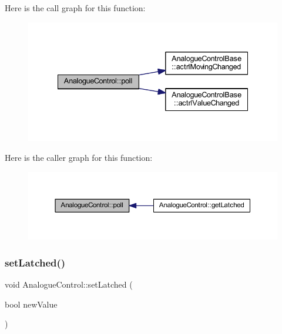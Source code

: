 Here is the call graph for this function\+:
\nopagebreak
\begin{figure}[H]
\begin{center}
\leavevmode
\includegraphics[width=335pt]{dc/daa/class_analogue_control_a5ec0b55a6abd8c73e61f86f2322251a5_cgraph}
\end{center}
\end{figure}
Here is the caller graph for this function\+:
\nopagebreak
\begin{figure}[H]
\begin{center}
\leavevmode
\includegraphics[width=350pt]{dc/daa/class_analogue_control_a5ec0b55a6abd8c73e61f86f2322251a5_icgraph}
\end{center}
\end{figure}
\mbox{\label{class_analogue_control_a3dd85b57a3fe8eceddcd2e4bbfce1ea9}} 
\subsubsection{\texorpdfstring{set\+Latched()}{setLatched()}}
{\footnotesize\ttfamily void Analogue\+Control\+::set\+Latched (\begin{DoxyParamCaption}\item[{bool}]{new\+Value }\end{DoxyParamCaption})\hspace{0.3cm}{\ttfamily [inline]}}



